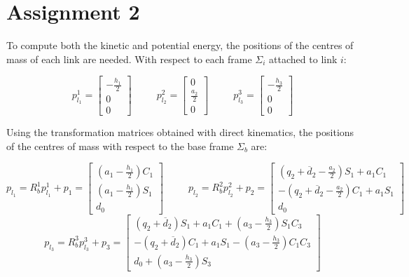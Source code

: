 \section{Assignment 2}

To compute both the kinetic and potential energy, the positions of the centres of mass of each link are needed. With respect to each frame $\Sigma_i$ attached to link $i$:

\begin{equation*}
p_{l_1}^1=\begin{bmatrix}
-\frac{h_1}{2}\\0\\0
\end{bmatrix}\;\;\;\;\;\;\;\;\;p_{l_2}^2=\begin{bmatrix}
0\\\frac{a_2}{2}\\0
\end{bmatrix}\;\;\;\;\;\;\;\;\;p_{l_3}^3=\begin{bmatrix}
-\frac{h_3}{2}\\0\\0
\end{bmatrix}
\end{equation*}

Using the transformation matrices obtained with direct kinematics, the positions of the centres of mass with respect to the base frame $\Sigma_b$ are:

\begin{equation*}
p_{l_1}=R_b^1p_{l_1}^1+p_1=\begin{bmatrix}
\left(a_1-\frac{h_1}{2}\right)C_1\\\left(a_1-\frac{h_1}{2}\right)S_1\\d_0
\end{bmatrix}\;\;\;\;\;\;\;\;\;p_{l_2}=R_b^2p_{l_2}^2+p_2=\begin{bmatrix}
\left(q_2+\overline d_2-\frac{a_2}{2}\right)S_1+a_1C_1\\-\left(q_2+\overline d_2-\frac{a_2}{2}\right)C_1+a_1S_1\\d_0
\end{bmatrix}
\end{equation*}
\begin{equation*}
p_{l_3}=R_b^3p_{l_3}^3+p_3=\begin{bmatrix}
(q_2+\overline d_2)S_1+a_1C_1+\left(a_3-\frac{h_3}{2}\right)S_1C_3\\ -(q_2+\overline d_2)C_1+a_1S_1-\left(a_3-\frac{h_3}{2}\right)C_1C_3\\d_0+\left(a_3-\frac{h_3}{2}\right)S_3
\end{bmatrix}
\end{equation*}



